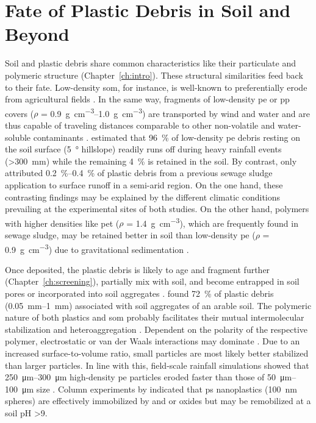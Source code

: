\section{Fate of Plastic Debris in Soil and Beyond}
\label{sec:general-discussion:fate}

Soil and plastic debris share common characteristics like their particulate and polymeric structure (Chapter~\ref{ch:intro}). These structural similarities feed back to their fate.
Low-density \ac{som}, for instance, is well-known to preferentially erode from agricultural fields \citep{LalSoil2005,RumpelPreferential2006}. In the same way, fragments of low-density \ac{pe} or \ac{pp} covers ($\rho$ = \SIrange{0.9}{1.0}{\gram\per\cubic\centi\meter}) are transported by wind \citep{RezaeiWind2019,BullardPreferential2021,RenMethod2021} and water \citep{LaermannsTracing2021,RehmSoil2021} and are thus capable of traveling distances comparable to other non-volatile and water-soluble contaminants \citep{StubbinsPlastics2021}.  estimated that \SI{96}{\percent} of low-density \ac{pe} debris resting on the soil surface (\SI{5}{\degree} hillslope) readily runs off during heavy rainfall events (\SI{>300}{\milli\meter}) while the remaining \SI{4}{\percent} is retained in the soil. By contrast, \citet{SchellFate2022} only attributed \SIrange{0.2}{0.4}{\percent} of plastic debris from a previous sewage sludge application to surface runoff in a semi-arid region. On the one hand, these contrasting findings may be explained by the different climatic conditions prevailing at the experimental sites of both studies. On the other hand, polymers with higher densities like \ac{pet} ($\rho$ = \SI{1.4}{\gram\per\cubic\centi\meter}), which are frequently found in sewage sludge, may be retained better in soil than low-density \ac{pe} ($\rho$ = \SI{0.9}{\gram\per\cubic\centi\meter}) due to gravitational sedimentation \citep{DongTransport2021,O'ConnorMicroplastics2019}.

Once deposited, the plastic debris is likely to age and fragment further (Chapter~\ref{ch:screening}), partially mix with soil, and become entrapped in soil pores or incorporated into soil aggregates \citep{RilligMicroplastic2017}.  found \SI{72}{\percent} of plastic debris (\SIrange{0.05}{1}{\milli\meter}) associated with soil aggregates of an arable soil. The polymeric nature of both plastics and \ac{som} probably facilitates their mutual intermolecular stabilization and heteroaggregation \citep{SchaumannSoil2006,LuoDistribution2020}. Dependent on the polarity of the respective polymer, electrostatic or van der Waals interactions may dominate \citep{LuoDistribution2020}. Due to an increased surface-to-volume ratio, small particles are most likely better stabilized than larger particles. In line with this, field-scale rainfall simulations showed that \SIrange{250}{300}{\micro\meter} high-density \ac{pe} particles eroded faster than those of \SIrange{50}{100}{\micro\meter} size \citep{RehmSoil2021}. Column experiments by \citet{WuTransport2020} indicated that \ac{ps} nanoplastics (\SI{100}{\nano\meter} spheres) are effectively immobilized by  and  or  oxides but may be remobilized at a soil pH \num{>9}.

